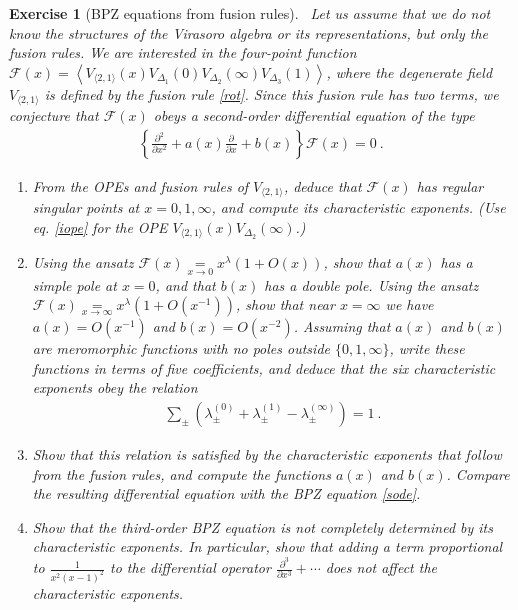 \documentclass[12pt, a4paper, notitlepage, twoside]{report}
\numberwithin{equation}{section}
\theoremstyle{break}
\newtheorem{exo}{Exercise}[chapter]
\begin{document}
\begin{exo}[BPZ equations from fusion rules]
 ~\label{exoefr}
Let us assume that we do not know the structures of the Virasoro algebra or its representations, but only the fusion rules. We are interested in the four-point function $\mathcal{F}(x) = \left\langle V_{\langle 2,1 \rangle}(x)V_{\Delta_1}(0)V_{\Delta_2}(\infty)V_{\Delta_3}(1)\right\rangle$, where the degenerate field $V_{\langle 2,1 \rangle}$ is defined by the fusion rule \eqref{rot}. Since this fusion rule has two terms, we conjecture that $\mathcal{F}(x)$ obeys a second-order differential equation of the type 
\begin{align}
 \left\{\frac{\partial^2}{\partial x^2} + a(x) \frac{\partial}{\partial x} + b(x) \right\} \mathcal{F}(x) = 0 \ .
\end{align}
\begin{enumerate}
\item From the OPEs and fusion rules of $V_{\langle 2,1\rangle}$, deduce that $\mathcal{F}(x)$ has regular singular points at $x=0,1,\infty$, and compute its characteristic exponents. (Use eq. \eqref{iope} for the OPE $V_{\langle 2,1 \rangle}(x)V_{\Delta_2}(\infty)$.)
\item Using the ansatz $\mathcal{F}(x)\underset{x\to 0}{=}x^\lambda(1+O(x))$, show that $a(x)$ has a simple pole at $x=0$, and that $b(x)$ has a double pole. Using the ansatz $\mathcal{F}(x)\underset{x\to \infty}{=}x^\lambda(1+O(x^{-1}))$, show that near $x=\infty$ we have $a(x)=O(x^{-1})$ and $b(x)= O(x^{-2})$. Assuming that $a(x)$ and $b(x)$ are meromorphic functions with no poles outside $\{0,1,\infty\}$, write these functions in terms of five coefficients, and deduce that the six characteristic exponents obey the relation
\begin{align}
 \sum_\pm \left(\lambda^{(0)}_\pm + \lambda^{(1)}_\pm -\lambda^{(\infty)}_\pm\right) = 1\ .
\end{align}
\item Show that this relation is satisfied by the characteristic exponents that follow from the fusion rules, and compute the functions $a(x)$ and $b(x)$. Compare the resulting differential equation with the BPZ equation \eqref{sode}.
 \item Show that the third-order BPZ equation is not completely determined by its characteristic exponents. In particular, show that adding a term proportional to $\frac{1}{x^2(x-1)^2}$ to the differential operator $\frac{\partial^3}{\partial x^3} + \cdots$ does not affect the characteristic exponents.
\end{enumerate}

\end{exo}
\end{document}
